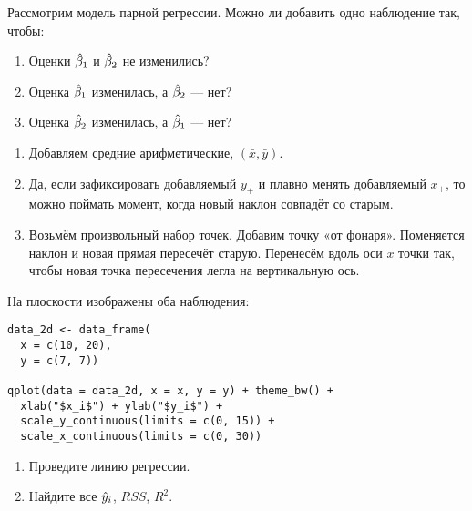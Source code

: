 \begin{problem}
Рассмотрим модель парной регрессии. Можно ли добавить одно наблюдение так, чтобы:
\begin{enumerate}
\item Оценки $\hb_1$ и $\hb_2$ не изменились?
\item Оценка $\hb_1$ изменилась, а $\hb_2$ — нет?
\item Оценка $\hb_2$ изменилась, а $\hb_1$ — нет?
\end{enumerate}

\begin{sol}
  \begin{enumerate}
  \item Добавляем средние арифметические, $(\bar x, \bar y)$.
  \item Да, если зафиксировать добавляемый $y_{+}$ и плавно менять добавляемый $x_{+}$, то можно поймать момент, когда новый наклон совпадёт со старым.
  \item Возьмём произвольный набор точек. Добавим точку «от фонаря». Поменяется наклон и новая прямая пересечёт старую. Перенесём вдоль оси $x$ точки так, чтобы новая точка пересечения легла на вертикальную ось.
  \end{enumerate}
\end{sol}
\end{problem}

\begin{problem}
На плоскости изображены оба наблюдения:

\begin{verbatim}
data_2d <- data_frame(
  x = c(10, 20),
  y = c(7, 7))

qplot(data = data_2d, x = x, y = y) + theme_bw() +
  xlab("$x_i$") + ylab("$y_i$") +
  scale_y_continuous(limits = c(0, 15)) +
  scale_x_continuous(limits = c(0, 30))
\end{verbatim}



\begin{minipage}{0.6\textwidth}
\begin{center}
\begin{tikzpicture}[scale = 0.025]

\end{tikzpicture}
\end{center}
\end{minipage}

\begin{enumerate}
\item Проведите линию регрессии.
\item Найдите все $\hy_i$, $RSS$, $R^2$.
\end{enumerate}

\begin{sol}
\end{sol}
\end{problem}

